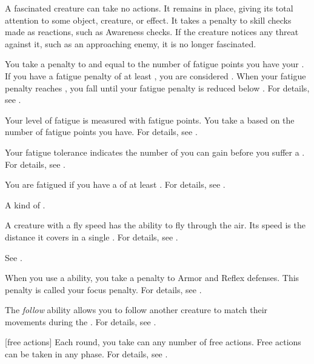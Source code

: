 A fascinated creature can take no actions. It remains in place, giving its total attention to some object, creature, or effect. It takes a  penalty to skill checks made as reactions, such as Awareness checks.
If the creature notices any threat against it, such as an approaching enemy, it is no longer fascinated.

 You take a penalty to  and  equal to the number of fatigue points you have \sub your .
If you have a fatigue penalty of at least , you are considered .
When your fatigue penalty reaches , you fall  until your fatigue penalty is reduced below .
For details, see .

 Your level of fatigue is measured with fatigue points.
You take a  based on the number of fatigue points you have.
For details, see .

 Your fatigue tolerance indicates the number of  you can gain before you suffer a .
For details, see .

 You are fatigued if you have a  of at least .
For details, see .

 A kind of .

 A creature with a fly speed has the ability to fly through the air.
Its speed is the distance it covers in a single .
For details, see .

 See .

 When you use a  ability, you take a  penalty to Armor and Reflex defenses.
This penalty is called your focus penalty.
For details, see .

 The \textit{follow} ability allows you to follow another creature to match their movements during the .
For details, see .

[free actions] Each round, you take can any number of free actions.
Free actions can be taken in any phase.
For details, see .

